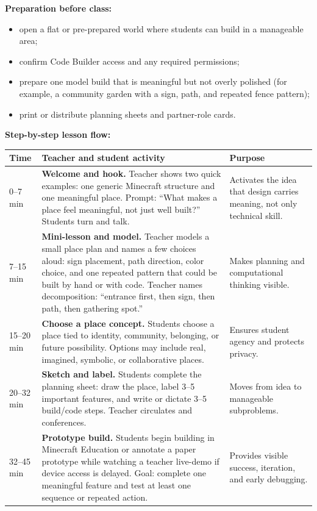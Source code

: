 \documentclass[11pt]{article}
\begin{document}
\textbf{Preparation before class:}
\begin{itemize}[leftmargin=*]
    \item open a flat or pre-prepared world where students can build in a manageable area;
    \item confirm Code Builder access and any required permissions;
    \item prepare one model build that is meaningful but not overly polished (for example, a community garden with a sign, path, and repeated fence pattern);
    \item print or distribute planning sheets and partner-role cards.
\end{itemize}

\textbf{Step-by-step lesson flow:}

\begin{tabularx}{\textwidth}{
    L{0.05\textwidth}
    L{0.7\textwidth}
    L{0.25\textwidth}
}
\toprule
\textbf{Time} & \textbf{Teacher and student activity} & \textbf{Purpose} \\
--7 min & \textbf{Welcome and hook.} Teacher shows two quick examples: one generic Minecraft structure and one meaningful place. Prompt: ``What makes a place feel meaningful, not just well built?'' Students turn and talk. & Activates the idea that design carries meaning, not only technical skill. \\
7--15 min & \textbf{Mini-lesson and model.} Teacher models a small place plan and names a few choices aloud: sign placement, path direction, color choice, and one repeated pattern that could be built by hand or with code. Teacher names decomposition: ``entrance first, then sign, then path, then gathering spot.'' & Makes planning and computational thinking visible. \\
15--20 min & \textbf{Choose a place concept.} Students choose a place tied to identity, community, belonging, or future possibility. Options may include real, imagined, symbolic, or collaborative places. & Ensures student agency and protects privacy. \\
20--32 min & \textbf{Sketch and label.} Students complete the planning sheet: draw the place, label 3--5 important features, and write or dictate 3--5 build/code steps. Teacher circulates and conferences. & Moves from idea to manageable subproblems. \\
32--45 min & \textbf{Prototype build.} Students begin building in Minecraft Education or annotate a paper prototype while watching a teacher live-demo if device access is delayed. Goal: complete one meaningful feature and test at least one sequence or repeated action. & Provides visible success, iteration, and early debugging. \\

\end{tabularx}
\end{document}
